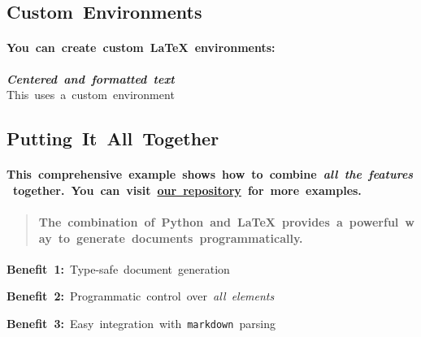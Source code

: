 \documentclass{article}
\begin{document}
{\begin{itemize}
{{\begin{enumerate}
\end{enumerate}}}
\end{itemize}\relax\relax \subsection{Custom~Environments}\relax \relax\relax \paragraph{You~can~create~custom~LaTeX~environments:}\relax \relax\relax \begin{center}
{\relax\relax \textbf{\textit{Centered~and~formatted~text}\relax }\relax \relax\relax \\\relax \relax\relax This~uses~a~custom~environment}
\end{center}\relax\relax \subsection{Putting~It~All~Together}\relax \relax\relax \paragraph{{\relax\relax This~\relax\relax \textbf{comprehensive~example}\relax \relax\relax ~shows~how~to~combine~\relax\relax \textit{all~the~features}\relax \relax\relax ~together.~You~can~visit~\relax\relax \href{https://github.com/pylatex}{\textbf{our~repository}\relax }\relax \relax\relax ~for~more~examples.}}\relax \relax\relax \begin{quote}
{\relax\relax \paragraph{{\relax\relax The~combination~of~\relax\relax \textbf{Python}\relax \relax\relax ~and~\relax\relax \textbf{LaTeX}\relax \relax\relax ~provides~a~powerful~way~to~generate~documents~programmatically.}}\relax }
\end{quote}\relax\relax \begin{enumerate}
{\relax\relax \item {\relax\relax \textbf{Benefit~1:}\relax \relax\relax ~Type-safe~document~generation}\relax\relax \item {\relax\relax \textbf{Benefit~2:}\relax \relax\relax ~Programmatic~control~over~\relax\relax \textit{all~elements}\relax }\relax\relax \item {\relax\relax \textbf{Benefit~3:}\relax \relax\relax ~Easy~integration~with~\relax\relax \texttt{markdown}\relax \relax\relax ~parsing}}

\end{enumerate}}
\end{document}
